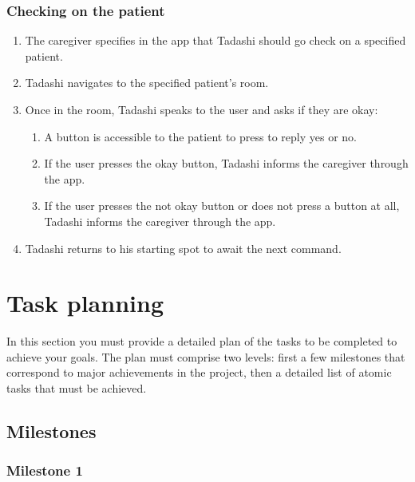 \documentclass{article}
\begin{document}
\subsubsection{Checking on the patient}
\begin{enumerate}
\item The caregiver specifies in the app that Tadashi should go check on a specified patient. 
\item Tadashi navigates to the specified patient's room.
\item Once in the room, Tadashi speaks to the user and asks if they are okay:
  \begin{enumerate}
  \item A button is accessible to the patient to press to reply yes or no.
  \item If the user presses the okay button, Tadashi informs the caregiver through the app. 
  \item If the user presses the not okay button or does not press a button at all, Tadashi informs the caregiver through the app.
  \end{enumerate}
\item Tadashi returns to his starting spot to await the next command. 
\end{enumerate}

\section{Task planning}
In this section you must provide a detailed plan of the tasks to be completed to achieve your goals. The plan must comprise two levels: first a few milestones that correspond to major achievements in the project, then a detailed list of atomic tasks that must be achieved.

\subsection{Milestones} 

\subsubsection{Milestone 1}
\end{document}
